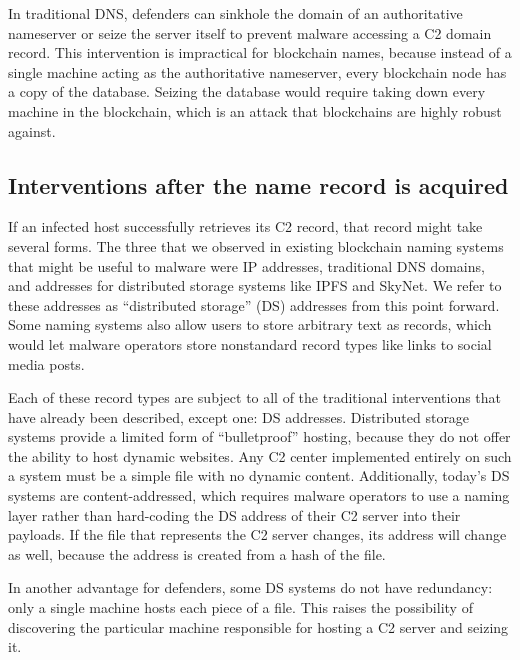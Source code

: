 In traditional DNS, defenders can sinkhole the domain of an 
authoritative nameserver or seize the server itself to 
prevent malware accessing a C2 domain record. This 
intervention is impractical for blockchain names, 
because instead of a single machine acting as the 
authoritative nameserver, every blockchain node has a copy of 
the database. Seizing the database would require taking down 
every machine in the blockchain, which is an attack that 
blockchains are highly robust against.

\subsection{Interventions after the name record is acquired}

If an infected host successfully retrieves its C2 record, 
that record might take several forms. The three that we 
observed in existing blockchain naming systems that might be 
useful to malware were IP addresses, traditional DNS domains, 
and addresses for distributed storage systems like IPFS and 
SkyNet. We refer to these addresses as ``distributed 
storage'' (DS) addresses from this point forward. Some naming 
systems also allow users to store arbitrary text as 
records, which would let malware operators store nonstandard 
record types like links to social media posts. 

Each of these record types are subject to all of the 
traditional interventions that have already 
been described, except one: DS addresses. Distributed storage 
systems provide a limited form of ``bulletproof'' hosting, 
because they do not offer the ability to host dynamic 
websites. Any C2 center implemented entirely on such a 
system must be a simple file with no 
dynamic content. Additionally, today's DS systems are 
content-addressed, which requires malware operators to use a 
naming layer rather than hard-coding the DS address of 
their C2 server into their payloads. If the file that 
represents the C2 server changes, its address will change as 
well, because the address is created from a hash of the file.

In another advantage for defenders, some DS systems do not 
have redundancy: only a single machine hosts each piece of a 
file. This raises the possibility of 
discovering the particular 
machine responsible for hosting a C2 server and seizing 
it. 


